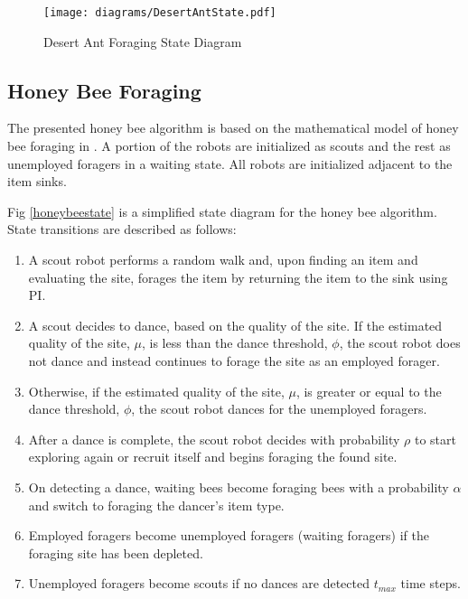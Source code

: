 \begin{figure}[h]
	\centering
	\texttt{[image: diagrams/DesertAntState.pdf]}
	\caption{Desert Ant Foraging State Diagram}
	\label{fig:desertantstate}
\end{figure}
	

\subsection{Honey Bee Foraging}

The presented honey bee algorithm is based on the mathematical model of honey bee foraging in \cite{seeley2009wisdom}. A portion of the robots are initialized as scouts and the rest  as unemployed foragers in a waiting state. All robots are initialized adjacent to the item sinks.

Fig \ref{honeybeestate} is a simplified state diagram for the honey bee algorithm. State transitions are described as follows: 

\begin{enumerate}

\item A scout robot performs a random walk and, upon finding an item and evaluating the site, forages the item by returning the item to the sink using PI. 

\item A scout decides to dance, based on the quality of the site. If the estimated quality of the site, $\mu$, is less than the dance threshold, $\phi$, the scout robot does not dance and instead continues to forage the site as an employed forager.

\item Otherwise, if the estimated quality of the site, $\mu$, is greater or equal to the dance threshold, $\phi$, the scout robot dances for the unemployed foragers.

\item After a dance is complete, the scout robot decides with probability $\rho$ to start exploring again or recruit itself and begins foraging the found site.

\item On detecting a dance, waiting bees become foraging bees with a probability $\alpha$ and switch to foraging the dancer's item type.

\item Employed foragers become unemployed foragers (waiting foragers) if the foraging site has been depleted.

\item Unemployed foragers become scouts if no dances are detected $t_{max}$ time steps.

\end{enumerate}

